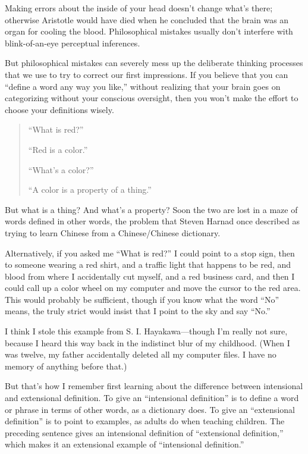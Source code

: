 {{{
 Making errors about the inside of your head
doesn't change what's there; otherwise
Aristotle would have died when he concluded that the brain was an organ
for cooling the blood. Philosophical mistakes usually
don't interfere with blink-of-an-eye perceptual
inferences.}

{
 But philosophical mistakes can severely mess up the deliberate
thinking processes that we use to try to correct our first impressions.
If you believe that you can ``define a word any way
you like,'' without realizing that your brain goes on
categorizing without your conscious oversight, then you
won't make the effort to choose your definitions
wisely.}

\myendsectiontext


\begin{quote}
{
 ``What is red?''}

{
 ``Red is a color.''}

{
 ``What's a
color?''}

{
 ``A color is a property of a
  thing.''}
\end{quote}

{
 But what is a thing? And what's a property? Soon
the two are lost in a maze of words defined in other words, the problem
that Steven Harnad once described as trying to learn Chinese from a
Chinese/Chinese dictionary.}

{
 Alternatively, if you asked me ``What is
red?'' I could point to a stop sign, then to someone
wearing a red shirt, and a traffic light that happens to be red, and
blood from where I accidentally cut myself, and a red business card,
and then I could call up a color wheel on my computer and move the
cursor to the red area. This would probably be sufficient, though if
you know what the word ``No'' means,
the truly strict would insist that I point to the sky and say
``No.''}

{
 I think I stole this example from S. I. Hayakawa---though
I'm really not sure, because I heard this way back in
the indistinct blur of my childhood. (When I was twelve, my father
accidentally deleted all my computer files. I have no memory of
anything before that.)}

{
 But that's how I remember first learning about the
difference between intensional and extensional definition. To give an
``intensional definition'' is to
define a word or phrase in terms of other words, as a dictionary does.
To give an ``extensional
definition'' is to point to examples, as adults do
when teaching children. The preceding sentence gives an intensional
definition of ``extensional
definition,'' which makes it an extensional example
of ``intensional definition.''}

}}
